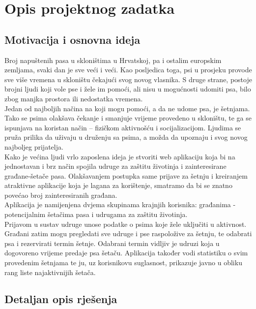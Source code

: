\chapter{Opis projektnog zadatka}

    \section{Motivacija i osnovna ideja}
    
        Broj napuštenih pasa u skloništima u Hrvatskoj, pa i ostalim europskim zemljama, svaki dan je sve veći i veći. Kao posljedica toga, psi u prosjeku provode sve više vremena u skloništu čekajući svog novog vlasnika. S druge strane, postoje brojni ljudi koji vole pse i žele im pomoći, ali nisu u mogućnosti udomiti psa, bilo zbog manjka prostora ili nedostatka vremena. \newline \\
        Jedan od najboljih načina na koji mogu pomoći, a da ne udome psa, je šetnjama. Tako se psima olakšava čekanje i smanjuje vrijeme provedeno u skloništu, te ga se ispunjava na koristan način – fizičkom aktivnošću i socijalizacijom.
        Ljudima se pruža prilika da uživaju u druženju sa psima, a možda da upoznaju i svog novog najboljeg prijatelja. \newline \\
        Kako je većina ljudi vrlo zaposlena ideja je stvoriti web aplikaciju koja bi na jednostavan i brz način spojila udruge za zaštitu životinja i zainteresirane građane-šetače pasa. Olakšavanjem postupka same prijave za šetnju i kreiranjem atraktivne aplikacije koja je lagana za korištenje, smatramo da bi se znatno povećao broj zainteresiranih građana. \newline \\
        Aplikacija je namijenjena dvjema skupinama krajnjih korisnika: građanima - potencijalnim šetačima pasa i udrugama za zaštitu životinja. \newline \\
        Prijavom u sustav udruge unose podatke o psima koje žele uključiti u aktivnost. Građani zatim mogu pregledati sve udruge i pse raspoložive za šetnju, te odabrati psa i rezervirati termin šetnje. Odabrani termin vidljiv je udruzi koja u dogovoreno vrijeme predaje psa šetaču. Aplikacija također vodi statistiku o svim provedenim šetnjama te ju, uz korisnikovu suglasnost, prikazuje javno u obliku rang liste najaktivnijih šetača.
        
    \section{Detaljan opis rješenja}
